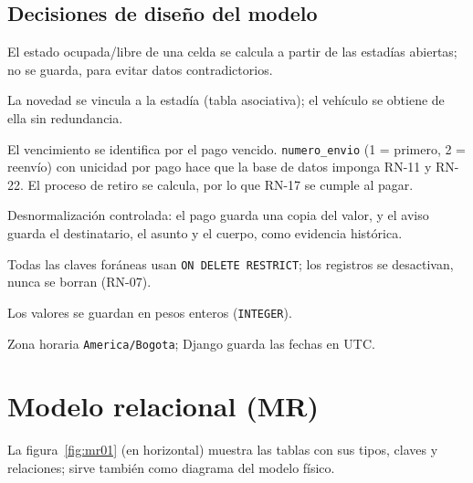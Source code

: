 \subsection{Decisiones de diseño del modelo}
\begin{description}[style=nextline]
  \item[DM-01] El estado ocupada/libre de una celda se calcula a partir de las estadías abiertas; no se guarda, para evitar datos contradictorios.
  \item[DM-02] La novedad se vincula a la estadía (tabla asociativa); el vehículo se obtiene de ella sin redundancia.
  \item[DM-03] El vencimiento se identifica por el pago vencido. \texttt{numero\_envio} (1 = primero, 2 = reenvío) con unicidad por pago hace que la base de datos imponga RN-11 y RN-22. El proceso de retiro se calcula, por lo que RN-17 se cumple al pagar.
  \item[DM-04] Desnormalización controlada: el pago guarda una copia del valor, y el aviso guarda el destinatario, el asunto y el cuerpo, como evidencia histórica.
  \item[DM-05] Todas las claves foráneas usan \texttt{ON DELETE RESTRICT}; los registros se desactivan, nunca se borran (RN-07).
  \item[DM-06] Los valores se guardan en pesos enteros (\texttt{INTEGER}).
  \item[DM-07] Zona horaria \texttt{America/Bogota}; Django guarda las fechas en UTC.
\end{description}

\section{Modelo relacional (MR)}
La figura~\ref{fig:mr01} (en horizontal) muestra las tablas con sus tipos, claves y relaciones; sirve también como diagrama del modelo físico.

